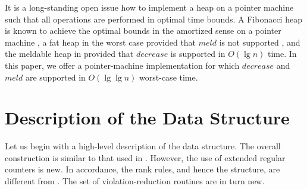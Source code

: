 \documentclass{llncs}
\newcommand{\Decrease}{\mbox{$\mathit{decrease}$}}
\newcommand{\Meld}{\mbox{$\mathit{meld}$}}
\begin{document}
It is a long-standing open issue how to implement a heap on a
pointer machine such that
all operations are performed in optimal time bounds.
A Fibonacci heap is known to achieve the optimal bounds in the
amortized sense on a pointer machine \cite{KT08}, a fat heap in 
the worst case provided that \Meld{} is not supported \cite{KT99},
and the meldable heap in \cite{Bro95} provided that \Decrease{} is supported in $O(\lg n)$ time.  
In this paper, we offer a pointer-machine implementation for which 
\Decrease{} and \Meld{} are supported in $O(\lg \lg n)$ worst-case time.

\section{Description of the Data Structure}

Let us begin with a high-level description of the data structure.
The overall construction is similar to that used in
\cite{Bro96}.  However, the use of extended regular counters is new.
In accordance, the rank rules, and hence the structure, are different from \cite{Bro96}.
The set of violation-reduction routines are in turn new.
\end{document}
